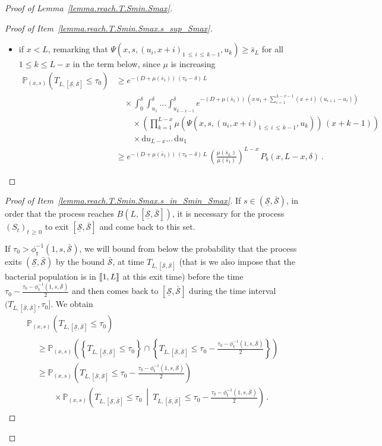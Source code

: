 \documentclass[10pt]{amsart}
\theoremstyle{definition}\newtheorem{defi}[theo]{Definition}\newtheorem{rema}[theo]{Remark}\newtheorem{exam}[theo]{Example}\newtheorem{exem}[theo]{Example}\newtheorem{nota}[theo]{Notation}
\newcommand{\llbracket}{\mathopen{[\mkern -2.7mu[}}
\newcommand{\rrbracket}{\mathclose{]\mkern -2.7mu]}}
\newcommand{\PP}{\mathbb{P}}
\newcommand{\dif}{\mathrm{d}}
\newcommand{\Smin}{\underline{\mathcal{S}}}
\newcommand{\Smax}{\bar{\mathcal{S}}}
\newcommand{\barmu}{\mu(\bar s_1)}
\newcommand{\phit}{\phi_\textsf{t}^{-1}}
\newcommand{\1}{\mathbf{1}}
\begin{document}
\begin{proof}[Proof of Lemma~\ref{lemma.reach.T.Smin.Smax}]
\begin{proof}[{Proof of Item~\eqref{lemma.reach.T.Smin.Smax.s_sup_Smax}}]
\begin{itemize}
\item if $x<L$, remarking that $\Psi(x,s,(u_i,x+i)_{1\,\leq\,i\,\leq\,k-1},u_k)\geq \bar s_L$ for all $1\leq k\leq L-x$ in the term below, since $\mu$ is increasing
\begin{align*}
\PP_{(x,s)}\left(T_{L, [\Smin,\Smax]}\leq \tau_0\right) &\geq e^{-(D+\barmu)\,(\tau_0-\delta)\,L}\,
\\
& \quad \times
\int_0^{\delta} \int_{u_1}^{\delta}\dots \int_{u_{L-x-1}}^{\delta} e^{-(D+\barmu)\,\left(x\,u_1+
\sum\limits_{i=1}^{L-x-1}(x+i)\,(u_{i+1}-u_{i})\right)}\,
\\
& \qquad \times
\left(\prod_{k=1}^{L-x}\mu\left(\Psi\left(x,s,(u_i,x+i)_{1\,\leq\,i\,\leq\,k-1},u_k\right)\right)\,(x+k-1)\right)
\,
\\
& \qquad \times
\dif u_{L-x}\dots\,\dif u_1
\\
&\geq e^{-(D+\barmu)\,(\tau_0-\delta)\,L}\,\left(\frac{\mu(\bar s_L)}{\barmu}\right)^{L-x}\, P_b(x,L-x, \delta)\,.
\end{align*}
\end{itemize}\let\qed\relax
\end{proof}

\begin{proof}[{Proof of Item~\eqref{lemma.reach.T.Smin.Smax.s_in_Smin_Smax}}]
If $s\in (\Smin,\Smax)$, in order that the process reaches $B(L,[\Smin,\Smax])$, it is necessary for the process $(S_t)_{t\,\geq\,0}$ to exit $[\Smin,\Smax]$ and come back to this set.

If $\tau_0>\phit(1, s,\Smax)$, we will bound from below the probability that the process exits $(\Smin,\Smax)$ by the bound $\Smax$, at time $T_{L,[\Smax,\Smax]}$ (that is we also impose that the bacterial population is in $\llbracket 1, L\rrbracket$ at this exit time) before the time $\tau_0-\frac{\tau_0-\phit(1, s,\Smax)}{2}$ and then comes back to $[\Smin,\Smax]$ during the time interval $(T_{L,[\Smax,\Smax]},\tau_0]$. We obtain
\begin{multline}\label{lemma.reachS.proba.decompo}
\PP_{(x,s)}\left(T_{L,[\Smin,\Smax]}\leq \tau_0\right)
\\
\begin{aligned}
&\geq
\PP_{(x,s)}\left(\left\{T_{L,[\Smin,\Smax]}\leq\tau_0\right\}
\cap \left\{T_{L,\left[\Smax,\Smax\right]}\leq \tau_0-\frac{\tau_0-\phit\left(1, s,\Smax\right)}{2}\right\}\right)
\\
&\geq
\PP_{(x,s)}\left(T_{L,\left[\Smax,\Smax\right]}\leq \tau_0-\frac{\tau_0-\phit\left(1, s,\Smax\right)}{2}\right)
\\
& \qquad\times
\PP_{(x,s)}\left(T_{L,\left[\Smin,\Smax\right]}\leq\tau_0\ \middle| \ T_{L,[\Smax,\Smax]}\leq \tau_0-\frac{\tau_0-\phit\left(1, s,\Smax\right)}{2} \right)\,.
\end{aligned}
\end{multline}


\end{proof}
\end{proof}
\end{document}

